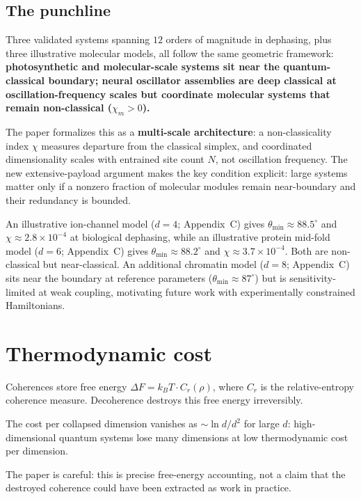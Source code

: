 \documentclass[11pt,a4paper]{article}
\begin{document}
\subsection*{The punchline}

Three validated systems spanning $12$ orders of magnitude in dephasing, plus three illustrative molecular models, all follow the same geometric framework: \textbf{photosynthetic and molecular-scale systems sit near the quantum-classical boundary; neural oscillator assemblies are deep classical at oscillation-frequency scales but coordinate molecular systems that remain non-classical ($\chi_m>0$).}

The paper formalizes this as a \textbf{multi-scale architecture}: a non-classicality index $\chi$ measures departure from the classical simplex, and coordinated dimensionality scales with entrained site count $N$, not oscillation frequency.  The new extensive-payload argument makes the key condition explicit: large systems matter only if a nonzero fraction of molecular modules remain near-boundary and their redundancy is bounded.

An illustrative ion-channel model ($d = 4$; Appendix~C) gives $\theta_{\min}\approx 88.5^\circ$ and $\chi\approx2.8\times10^{-4}$ at biological dephasing, while an illustrative protein mid-fold model ($d=6$; Appendix~C) gives $\theta_{\min}\approx88.2^\circ$ and $\chi\approx3.7\times10^{-4}$.  Both are non-classical but near-classical.  An additional chromatin model ($d = 8$; Appendix~C) sits near the boundary at reference parameters ($\theta_{\min}\approx87^\circ$) but is sensitivity-limited at weak coupling, motivating future work with experimentally constrained Hamiltonians.

\section*{Thermodynamic cost}

Coherences store free energy $\Delta F = k_B T \cdot C_r(\rho)$, where $C_r$ is the relative-entropy coherence measure.  Decoherence destroys this free energy irreversibly.

The cost per collapsed dimension vanishes as $\sim \ln d / d^2$ for large $d$: high-dimensional quantum systems lose many dimensions at low thermodynamic cost per dimension.

The paper is careful: this is precise free-energy accounting, not a claim that the destroyed coherence could have been extracted as work in practice.
\end{document}
